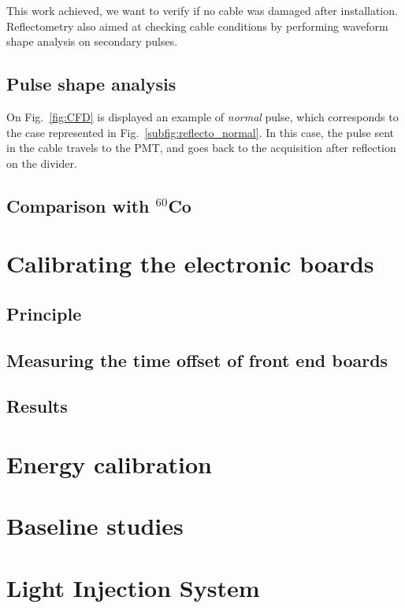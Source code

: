This work achieved, we want to verify if no cable was damaged after installation.
Reflectometry also aimed at checking cable conditions by performing waveform shape analysis on secondary pulses.

\subsection{Pulse shape analysis}
\label{subsec:pulse_shape}
On Fig.~\ref{fig:CFD} is displayed an example of \emph{normal} pulse, which corresponds to the case represented in Fig.~\ref{subfig:reflecto_normal}.
In this case, the pulse sent in the cable travels to the PMT, and goes back to the acquisition after reflection on the divider.


\subsection{Comparison with $^{60}$Co}



\section{Calibrating the electronic boards}
\label{sec:TimeSynchroFEB}

\subsection{Principle}
\subsection{Measuring the time offset of front end boards}
\subsection{Results}


\section{Energy calibration}
\label{sec:comm_energy_calibration}

\section{Baseline studies}
\label{sec:comm_baseline}

\section{Light Injection System}
\label{sec:LI}






